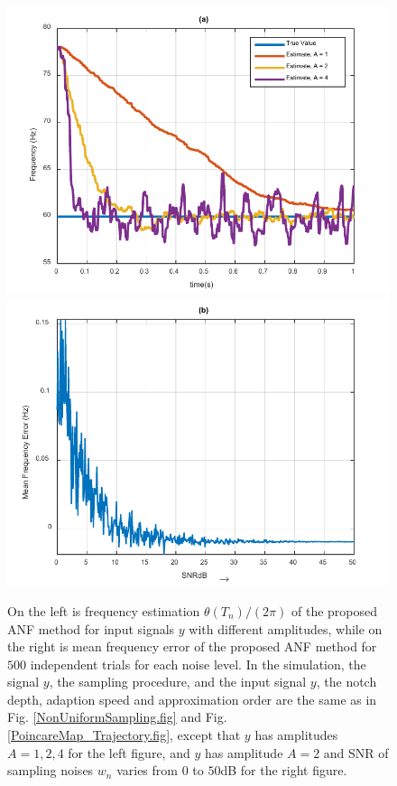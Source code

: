 \documentclass{UCF_ETD}
\begin{document}
 \begin{figure}[H]
 \begin{center}
 \includegraphics[scale=0.75]{NonuniformANF/EstimateDiffAmplitudes} %
 \includegraphics[scale=0.75]{NonuniformANF/MeanFreqErrorVsSNR} %
 \caption{On the left is frequency estimation $\theta(T_n)/(2\pi)$ of the proposed ANF method
  for input signals $y$ with different amplitudes, while on the right is mean frequency error  of the proposed ANF method
 for $500$ independent trials for each noise level.
 In the simulation, the signal $y$, the sampling procedure,
  and the input signal $y$, the notch  depth, adaption speed  and approximation order  are the same as in Fig.
  \ref{NonUniformSampling.fig} and Fig. \ref{PoincareMap_Trajectory.fig}, except that
  $y$ has amplitudes $A=1, 2, 4$ for the left figure, and
  $y$ has amplitude $A=2$ and SNR of sampling noises  $w_n$ varies  from $0$ to $50$dB for the right figure.
 }
 \label{AmplitudessvsFreq.fig}
 \end{center}
 \end{figure}
 
\end{document}
